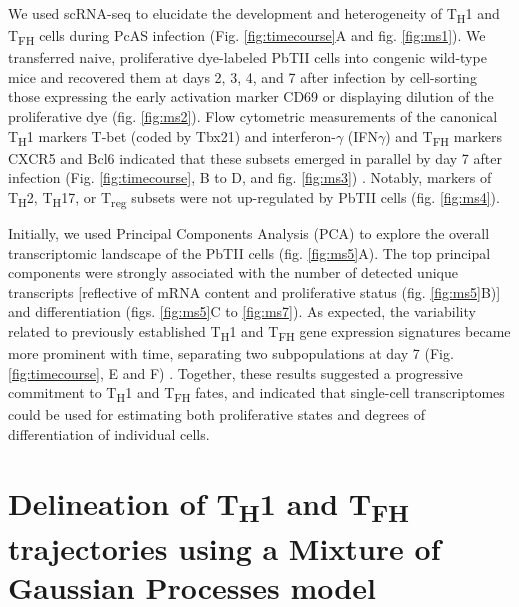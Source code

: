 We used scRNA-seq to elucidate the development and heterogeneity of T\textsubscript{H}1 and T\textsubscript{FH} cells during PcAS infection (Fig. \ref{fig:timecourse}A and fig. \ref{fig:ms1}). We transferred naive, proliferative dye-labeled PbTII cells into congenic wild-type mice and recovered them at days 2, 3, 4, and 7 after infection by cell-sorting those expressing the early activation marker CD69 or displaying dilution of the proliferative dye (fig. \ref{fig:ms2}). Flow cytometric measurements of the canonical T\textsubscript{H}1 markers T-bet (coded by Tbx21) and interferon-\( \gamma \) (IFN\( \gamma \)) and T\textsubscript{FH} markers CXCR5 and Bcl6 indicated that these subsets emerged in parallel by day 7 after infection (Fig. \ref{fig:timecourse}, B to D, and fig. \ref{fig:ms3}) \cite{Johnston2009-rz, Szabo2000-dh}. Notably, markers of T\textsubscript{H}2, T\textsubscript{H}17, or T\textsubscript{reg} subsets were not up-regulated by PbTII cells (fig. \ref{fig:ms4}).

Initially, we used Principal Components Analysis (PCA) to explore the overall transcriptomic landscape of the PbTII cells (fig. \ref{fig:ms5}A). The top principal components were strongly associated with the number of detected unique transcripts [reflective of mRNA content and proliferative status (fig. \ref{fig:ms5}B)] and differentiation (figs. \ref{fig:ms5}C to \ref{fig:ms7}). As expected, the variability related to previously established T\textsubscript{H}1 and T\textsubscript{FH} gene expression signatures became more prominent with time, separating two subpopulations at day 7 (Fig. \ref{fig:timecourse}, E and F) \cite{Hale2013-yb}. Together, these results suggested a progressive commitment to T\textsubscript{H}1 and T\textsubscript{FH} fates, and indicated that single-cell transcriptomes could be used for estimating both proliferative states and degrees of differentiation of individual cells.

\section{Delineation of \texorpdfstring{T\textsubscript{H}1}{TH1} and \texorpdfstring{T\textsubscript{FH}}{TFH} trajectories using a Mixture of Gaussian Processes model}

